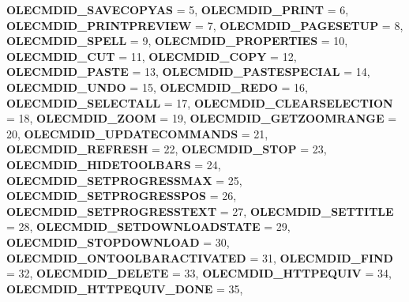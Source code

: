 \begin{DoxyCompactItemize}
\newline
{\bfseries O\+L\+E\+C\+M\+D\+I\+D\+\_\+\+S\+A\+V\+E\+C\+O\+P\+Y\+AS} = 5, 
{\bfseries O\+L\+E\+C\+M\+D\+I\+D\+\_\+\+P\+R\+I\+NT} = 6, 
{\bfseries O\+L\+E\+C\+M\+D\+I\+D\+\_\+\+P\+R\+I\+N\+T\+P\+R\+E\+V\+I\+EW} = 7, 
{\bfseries O\+L\+E\+C\+M\+D\+I\+D\+\_\+\+P\+A\+G\+E\+S\+E\+T\+UP} = 8, 
\newline
{\bfseries O\+L\+E\+C\+M\+D\+I\+D\+\_\+\+S\+P\+E\+LL} = 9, 
{\bfseries O\+L\+E\+C\+M\+D\+I\+D\+\_\+\+P\+R\+O\+P\+E\+R\+T\+I\+ES} = 10, 
{\bfseries O\+L\+E\+C\+M\+D\+I\+D\+\_\+\+C\+UT} = 11, 
{\bfseries O\+L\+E\+C\+M\+D\+I\+D\+\_\+\+C\+O\+PY} = 12, 
\newline
{\bfseries O\+L\+E\+C\+M\+D\+I\+D\+\_\+\+P\+A\+S\+TE} = 13, 
{\bfseries O\+L\+E\+C\+M\+D\+I\+D\+\_\+\+P\+A\+S\+T\+E\+S\+P\+E\+C\+I\+AL} = 14, 
{\bfseries O\+L\+E\+C\+M\+D\+I\+D\+\_\+\+U\+N\+DO} = 15, 
{\bfseries O\+L\+E\+C\+M\+D\+I\+D\+\_\+\+R\+E\+DO} = 16, 
\newline
{\bfseries O\+L\+E\+C\+M\+D\+I\+D\+\_\+\+S\+E\+L\+E\+C\+T\+A\+LL} = 17, 
{\bfseries O\+L\+E\+C\+M\+D\+I\+D\+\_\+\+C\+L\+E\+A\+R\+S\+E\+L\+E\+C\+T\+I\+ON} = 18, 
{\bfseries O\+L\+E\+C\+M\+D\+I\+D\+\_\+\+Z\+O\+OM} = 19, 
{\bfseries O\+L\+E\+C\+M\+D\+I\+D\+\_\+\+G\+E\+T\+Z\+O\+O\+M\+R\+A\+N\+GE} = 20, 
\newline
{\bfseries O\+L\+E\+C\+M\+D\+I\+D\+\_\+\+U\+P\+D\+A\+T\+E\+C\+O\+M\+M\+A\+N\+DS} = 21, 
{\bfseries O\+L\+E\+C\+M\+D\+I\+D\+\_\+\+R\+E\+F\+R\+E\+SH} = 22, 
{\bfseries O\+L\+E\+C\+M\+D\+I\+D\+\_\+\+S\+T\+OP} = 23, 
{\bfseries O\+L\+E\+C\+M\+D\+I\+D\+\_\+\+H\+I\+D\+E\+T\+O\+O\+L\+B\+A\+RS} = 24, 
\newline
{\bfseries O\+L\+E\+C\+M\+D\+I\+D\+\_\+\+S\+E\+T\+P\+R\+O\+G\+R\+E\+S\+S\+M\+AX} = 25, 
{\bfseries O\+L\+E\+C\+M\+D\+I\+D\+\_\+\+S\+E\+T\+P\+R\+O\+G\+R\+E\+S\+S\+P\+OS} = 26, 
{\bfseries O\+L\+E\+C\+M\+D\+I\+D\+\_\+\+S\+E\+T\+P\+R\+O\+G\+R\+E\+S\+S\+T\+E\+XT} = 27, 
{\bfseries O\+L\+E\+C\+M\+D\+I\+D\+\_\+\+S\+E\+T\+T\+I\+T\+LE} = 28, 
\newline
{\bfseries O\+L\+E\+C\+M\+D\+I\+D\+\_\+\+S\+E\+T\+D\+O\+W\+N\+L\+O\+A\+D\+S\+T\+A\+TE} = 29, 
{\bfseries O\+L\+E\+C\+M\+D\+I\+D\+\_\+\+S\+T\+O\+P\+D\+O\+W\+N\+L\+O\+AD} = 30, 
{\bfseries O\+L\+E\+C\+M\+D\+I\+D\+\_\+\+O\+N\+T\+O\+O\+L\+B\+A\+R\+A\+C\+T\+I\+V\+A\+T\+ED} = 31, 
{\bfseries O\+L\+E\+C\+M\+D\+I\+D\+\_\+\+F\+I\+ND} = 32, 
\newline
{\bfseries O\+L\+E\+C\+M\+D\+I\+D\+\_\+\+D\+E\+L\+E\+TE} = 33, 
{\bfseries O\+L\+E\+C\+M\+D\+I\+D\+\_\+\+H\+T\+T\+P\+E\+Q\+U\+IV} = 34, 
{\bfseries O\+L\+E\+C\+M\+D\+I\+D\+\_\+\+H\+T\+T\+P\+E\+Q\+U\+I\+V\+\_\+\+D\+O\+NE} = 35, 

\end{DoxyCompactItemize}
